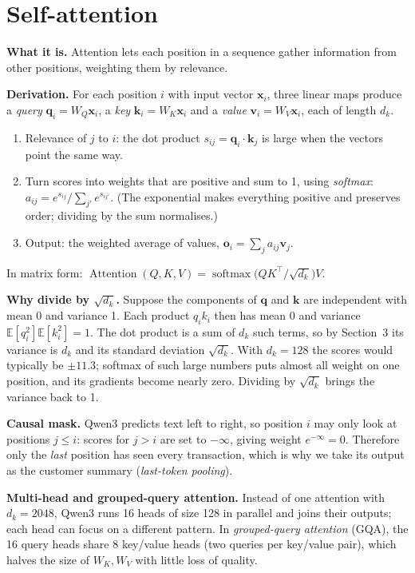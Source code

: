 \documentclass[10pt,a4paper]{article}
\newcommand{\what}[1]{\par\textbf{What it is.} #1}
\newcommand{\deriv}{\par\textbf{Derivation.} }
\begin{document}
\section{Self-attention}\label{sec:attn}
\what{Attention lets each position in a sequence gather information from other positions, weighting them by relevance.}
\deriv For each position $i$ with input vector $\mathbf{x}_i$, three linear maps produce a \emph{query} $\mathbf{q}_i=W_Q\mathbf{x}_i$, a \emph{key} $\mathbf{k}_i=W_K\mathbf{x}_i$ and a \emph{value} $\mathbf{v}_i=W_V\mathbf{x}_i$, each of length $d_k$.
\begin{enumerate}
\item Relevance of $j$ to $i$: the dot product $s_{ij}=\mathbf{q}_i\cdot\mathbf{k}_j$ is large when the vectors point the same way.
\item Turn scores into weights that are positive and sum to 1, using \emph{softmax}: $a_{ij}=e^{s_{ij}}/\sum_{j'}e^{s_{ij'}}$. (The exponential makes everything positive and preserves order; dividing by the sum normalises.)
\item Output: the weighted average of values, $\mathbf{o}_i=\sum_ja_{ij}\mathbf{v}_j$.
\end{enumerate}
In matrix form: $\operatorname{Attention}(Q,K,V)=\operatorname{softmax}\!\big(QK^\top/\sqrt{d_k}\big)V$.

\textbf{Why divide by $\sqrt{d_k}$.} Suppose the components of $\mathbf{q}$ and $\mathbf{k}$ are independent with mean 0 and variance 1. Each product $q_ik_i$ then has mean 0 and variance $\mathbb{E}[q_i^2]\mathbb{E}[k_i^2]=1$. The dot product is a sum of $d_k$ such terms, so by Section~3 its variance is $d_k$ and its standard deviation $\sqrt{d_k}$. With $d_k=128$ the scores would typically be $\pm11.3$; softmax of such large numbers puts almost all weight on one position, and its gradients become nearly zero. Dividing by $\sqrt{d_k}$ brings the variance back to 1.

\textbf{Causal mask.} Qwen3 predicts text left to right, so position $i$ may only look at positions $j\le i$: scores for $j>i$ are set to $-\infty$, giving weight $e^{-\infty}=0$. Therefore only the \emph{last} position has seen every transaction, which is why we take its output as the customer summary (\emph{last-token pooling}).

\textbf{Multi-head and grouped-query attention.} Instead of one attention with $d_k=2048$, Qwen3 runs 16 heads of size 128 in parallel and joins their outputs; each head can focus on a different pattern. In \emph{grouped-query attention} (GQA), the 16 query heads share 8 key/value heads (two queries per key/value pair), which halves the size of $W_K,W_V$ with little loss of quality.
\end{document}
